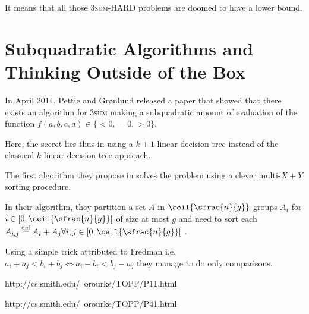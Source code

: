 It means that all those 3\textsc{sum}-HARD problems are doomed to have
a  lower bound.


\section{Subquadratic Algorithms and Thinking Outside of the Box}

In April 2014, Pettie and Grønlund released a paper that showed that there
exists an algorithm for 3\textsc{sum} making a subquadratic amount of evaluation
of the function $f( a, b, c, d ) \in \{ <0, =0, >0 \}$.

Here, the secret lies thus in using a $k+1$-linear decision tree instead of the
classical $k$-linear decision tree approach.

The first algorithm they propose in \cite{DBLP:journals/corr/JorgensenP14} solves
the problem using a clever multi-$X + Y$ sorting procedure.

In their algorithm, they partition a set $A$ in $\ceil{\sfrac{n}{g}}$ groups
$A_i$ for $i \in [0, \ceil{\sfrac{n}{g}}[$ of size at most $g$ and need to sort
each
$A_{i,j} \buildrel \text{d{}ef}\over = A_i + A_j \forall i, j \in [0, \ceil{\sfrac{n}{g}}[$
.

Using a simple trick attributed to Fredman i.e.
$a_i + a_j < b_i + b_j \iff a_i - b_i < b_j - a_j$ they manage to do only
 comparisons.


http://cs.smith.edu/~orourke/TOPP/P11.html

http://cs.smith.edu/~orourke/TOPP/P41.html
